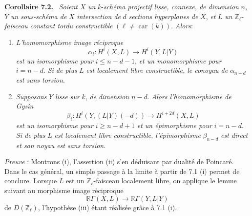 \documentclass[11pt]{article}
\newenvironment{statement}[1]{\par\medskip\noindent\textbf{#1.}\ }{\par\medskip}
\newcommand{\R}{\mathbb{R}}\newcommand{\RHomCore}{\mathbb{R}\mathrm{Hom}}
\providecommand{\R}{\mathrm R}
\begin{document}
\begin{statement}{Corollaire 7.2}
\emph{Soient} $X$ \emph{un} $k$-\emph{schéma projectif lisse, connexe, de dimension} $n$, $Y$ \emph{un sous-schéma de} $X$ \emph{intersection de} $d$ \emph{sections hyperplanes de} $X$, \emph{et} $L$ \emph{un} $\mathbb Z_\ell$-\emph{faisceau constant tordu constructible} $(\ell\ne\operatorname{car}(k))$. \emph{Alors}:
\begin{enumerate}[label=(\roman*)]
\item \emph{L'homomorphisme image réciproque}
\[
\alpha_i:H^i(X,L)\to H^i(Y,L|Y)
\]
\emph{est un isomorphisme pour} $i\le n-d-1$, \emph{et un monomorphisme pour} $i=n-d$. \emph{Si de plus} $L$ \emph{est localement libre constructible, le conoyau de} $\alpha_{n-d}$ \emph{est sans torsion}.
\item \emph{Supposons} $Y$ \emph{lisse sur} $k$, \emph{de dimension} $n-d$. \emph{Alors l'homomorphisme de Gysin}
\[
\beta_i:H^i(Y,(L|Y)(-d))\to H^{i+2d}(X,L)
\]
\emph{est un isomorphisme pour} $i\ge n-d+1$ \emph{et un épimorphisme pour} $i=n-d$. \emph{Si de plus} $L$ \emph{est localement libre constructible, l'épimorphisme} $\beta_{n-d}$ \emph{est direct et son noyau est sans torsion}.
\end{enumerate}
\end{statement}

\emph{Preuve} : Montrons (i), l'assertion (ii) s'en déduisant par dualité de Poincaré. Dans le cas général, un simple passage à la limite à partir de 7.1 (i) permet de conclure. Lorsque $L$ est un $\mathbb Z_\ell$-faisceau localement libre, on applique le lemme suivant au morphisme image réciproque
\[
\R\Gamma(X,L)\to \R\Gamma(Y,L|Y)
\]
de $D(\mathbb Z_\ell)$, l'hypothèse (iii) étant réalisée grâce à 7.1 (i).
\end{document}
